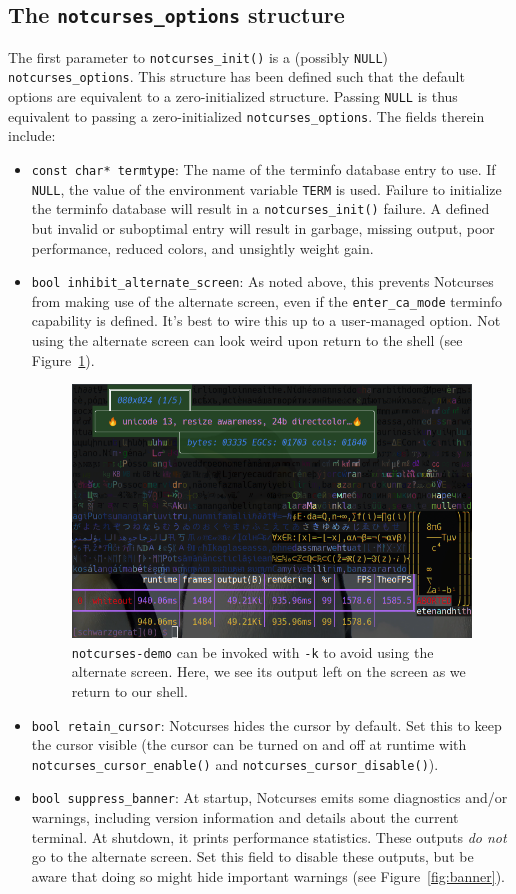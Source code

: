 \documentclass[letterpaper,10pt]{article}
\newenvironment{denseitemize}{
  \begin{itemize}
      \setlength{\itemsep}{0pt}
}{
  \end{itemize}
}
\begin{document}
\subsection{The \texttt{notcurses\_options} structure}
The first parameter to \texttt{notcurses\_init()} is a (possibly \texttt{NULL})
\texttt{notcurses\_options}. This structure has been defined such that the
default options are equivalent to a zero-initialized structure. Passing \texttt{NULL}
is thus equivalent to passing a zero-initialized \texttt{notcurses\_options}.
The fields therein include:
\begin{denseitemize}
\item{\texttt{const char* termtype}: The name of the terminfo database entry to
    use. If \texttt{NULL}, the value of the environment variable \texttt{TERM}
    is used. Failure to initialize the terminfo database will result in a
    \texttt{notcurses\_init()} failure.} A defined but invalid or suboptimal
    entry will result in garbage, missing output, poor performance, reduced
    colors, and unsightly weight gain.
\item{\texttt{bool inhibit\_alternate\_screen}: As noted above, this prevents
    Notcurses from making use of the alternate screen, even if the \texttt{enter\_ca\_mode}
    terminfo capability is defined. It's best to wire this up to a user-managed
    option. Not using the alternate screen can look weird upon return to the
    shell (see Figure~\ref{fig:altscreen}).

\begin{figure}[!htb]
\centering \includegraphics[width=.7\linewidth]{media/no-alternate-screen.png}
\caption[Inhibiting use of the alternate screen.]{\texttt{notcurses-demo} can be invoked with \texttt{-k} to avoid
  using the alternate screen. Here, we see its output left on the screen as
  we return to our shell.}
\label{fig:altscreen}
\end{figure}
  }
\item{\texttt{bool retain\_cursor}: Notcurses hides the cursor by default.
    Set this to keep the cursor visible (the cursor can be turned on and off
    at runtime with \texttt{notcurses\_cursor\_enable()} and
    \texttt{notcurses\_cursor\_disable()}).}
\item{\texttt{bool suppress\_banner}: At startup, Notcurses emits some
    diagnostics and/or warnings, including version information and details
    about the current terminal. At shutdown, it prints performance statistics.
    These outputs \textit{do not} go to the alternate screen. Set this
    field to disable these outputs, but be aware that doing so might hide
    important warnings (see Figure~\ref{fig:banner}).

}
\end{denseitemize}
\end{document}
